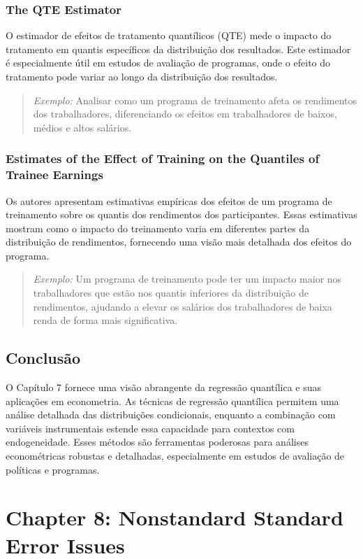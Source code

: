 \documentclass[a4paper,12pt]{article}[abntex2]
\begin{document}
\subsubsection{The QTE Estimator}
O estimador de efeitos de tratamento quantílicos (QTE) mede o impacto do tratamento em quantis específicos da distribuição dos resultados. Este estimador é especialmente útil em estudos de avaliação de programas, onde o efeito do tratamento pode variar ao longo da distribuição dos resultados.

\begin{quote}
\textit{Exemplo:} Analisar como um programa de treinamento afeta os rendimentos dos trabalhadores, diferenciando os efeitos em trabalhadores de baixos, médios e altos salários.
\end{quote}

\subsubsection{Estimates of the Effect of Training on the Quantiles of Trainee Earnings}
Os autores apresentam estimativas empíricas dos efeitos de um programa de treinamento sobre os quantis dos rendimentos dos participantes. Essas estimativas mostram como o impacto do treinamento varia em diferentes partes da distribuição de rendimentos, fornecendo uma visão mais detalhada dos efeitos do programa.

\begin{quote}
\textit{Exemplo:} Um programa de treinamento pode ter um impacto maior nos trabalhadores que estão nos quantis inferiores da distribuição de rendimentos, ajudando a elevar os salários dos trabalhadores de baixa renda de forma mais significativa.
\end{quote}

\subsection{Conclusão}
O Capítulo 7 fornece uma visão abrangente da regressão quantílica e suas aplicações em econometria. As técnicas de regressão quantílica permitem uma análise detalhada das distribuições condicionais, enquanto a combinação com variáveis instrumentais estende essa capacidade para contextos com endogeneidade. Esses métodos são ferramentas poderosas para análises econométricas robustas e detalhadas, especialmente em estudos de avaliação de políticas e programas.

\newpage

\section{Chapter 8: Nonstandard Standard Error Issues}
\end{document}
